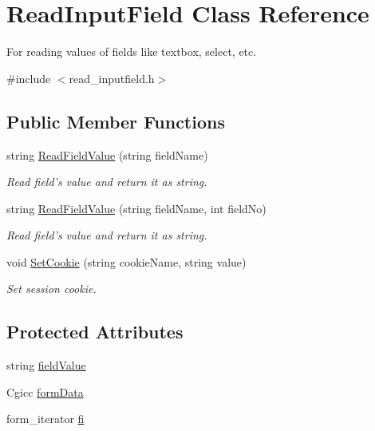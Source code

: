 \hypertarget{classReadInputField}{\section{Read\-Input\-Field Class Reference}
\label{classReadInputField}
}


For reading values of fields like textbox, select, etc.  




{\ttfamily \#include $<$read\-\_\-inputfield.\-h$>$}

\subsection*{Public Member Functions}
\begin{DoxyCompactItemize}
\item 
string \hyperlink{classReadInputField_a7f6e49b47412649644cc644927ccc682}{Read\-Field\-Value} (string field\-Name)
\begin{DoxyCompactList}\small\item\em Read field's value and return it as string. \end{DoxyCompactList}\item 
string \hyperlink{classReadInputField_accf7ceba77721a35968c69268e4e559e}{Read\-Field\-Value} (string field\-Name, int field\-No)
\begin{DoxyCompactList}\small\item\em Read field's value and return it as string. \end{DoxyCompactList}\item 
void \hyperlink{classReadInputField_a3389b2f46fd5b9168a4240606a35b464}{Set\-Cookie} (string cookie\-Name, string value)
\begin{DoxyCompactList}\small\item\em Set session cookie. \end{DoxyCompactList}\end{DoxyCompactItemize}
\subsection*{Protected Attributes}
\begin{DoxyCompactItemize}
\item 
string \hyperlink{classReadInputField_a0d95496b5fc8fb4badd4af19492182ae}{field\-Value}
\item 
Cgicc \hyperlink{classReadInputField_a1e4ebac8979fd9b2771320d669fce5fc}{form\-Data}
\item 
form\-\_\-iterator \hyperlink{classReadInputField_ae252dc321be04c2c1afa6928ad16a45d}{fi}
\end{DoxyCompactItemize}



